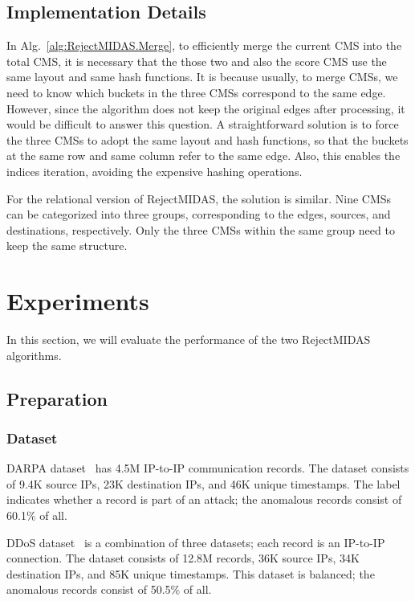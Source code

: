 \documentclass[5p]{elsarticle}
\begin{document}
	\subsection{Implementation Details}\label{sec:ImplementationDetails}

	In Alg.~\ref{alg:RejectMIDAS.Merge}, to efficiently merge the current CMS into the total CMS, it is necessary that the those two and also the score CMS use the same layout and same hash functions. It is because usually, to merge CMSs, we need to know which buckets in the three CMSs correspond to the same edge. However, since the algorithm does not keep the original edges after processing, it would be difficult to answer this question. A straightforward solution is to force the three CMSs to adopt the same layout and hash functions, so that the buckets at the same row and same column refer to the same edge. Also, this enables the indices iteration, avoiding the expensive hashing operations.

	For the relational version of RejectMIDAS, the solution is similar. Nine CMSs can be categorized into three groups, corresponding to the edges, sources, and destinations, respectively. Only the three CMSs within the same group need to keep the same structure.


	\section{Experiments}

	In this section, we will evaluate the performance of the two RejectMIDAS algorithms.

	\subsection{Preparation}

	\subsubsection{Dataset}

	DARPA dataset~\cite{lippmann1999results} has 4.5M IP-to-IP communication records. The dataset consists of 9.4K source IPs, 23K destination IPs, and 46K unique timestamps. The label indicates whether a record is part of an attack; the anomalous records consist of 60.1\% of all.

	DDoS dataset~\cite{prasad2019machine,sharafaldin2018toward,jazi2017detecting} is a combination of three datasets; each record is an IP-to-IP connection. The dataset consists of 12.8M records, 36K source IPs, 34K destination IPs, and 85K unique timestamps. This dataset is balanced; the anomalous records consist of 50.5\% of all.
\end{document}
